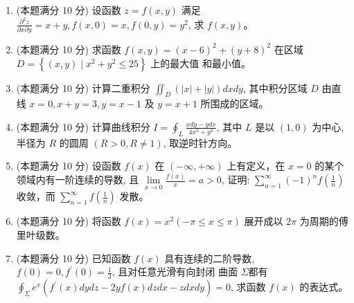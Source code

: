 \begin{enumerate}
\item 
(本题满分 10 分)
设函数 $z=f(x, y)$ 满足 $\frac{\partial^{2} z}{\partial x \partial y}=x+y, f(x, 0)=x, f(0, y)=y^{2}$, 求 $f(x, y)$。




\item 
(本题满分 10 分)
求函数 $f(x, y)=(x-6)^{2}+(y+8)^{2}$ 在区域 $D=\left\{(x, y) \mid x^{2}+y^{2} \leqslant 25\right\}$ 上的最大值 和最小值。



\newpage

\item 
(本题满分 10 分)
计算二重积分 $\iint_{D}(|x|+|y|) d x d y$, 其中积分区域 $D$ 由直线 $x=0, x+y=3, y=x-1$ 及 $y=x+1$ 所围成的区域。





\item 
(本题满分 10 分)
计算曲线积分 $I=\oint_{L} \frac{x d y-y d x}{4 x^{2}+y^{2}}$, 其中 $L$ 是以 $(1,0)$ 为中心, 半径为 $R$ 的圆周 $(R>0, R \neq 1)$, 取逆时针方向。




\item 
(本题满分 10 分)
设函数 $f(x)$ 在 $(-\infty,+\infty)$ 上有定义，在 $x=0$ 的某个领域内有一阶连续的导数, 且 $\lim\limits _{x \rightarrow 0} \frac{f(x)}{x}=a>0$, 证明:
$\sum\limits_{n=1}^{\infty}(-1)^{n} f\left(\frac{1}{n}\right)$ 收敛，而 $\sum\limits_{n=1}^{\infty} f\left(\frac{1}{n}\right)$ 发散。





\item 
(本题满分 10 分)
将函数 $f(x)=x^{2}(-\pi \leqslant x \leqslant \pi)$ 展开成以 $2 \pi$ 为周期的傅里叶级数。




\item 
(本题满分 10 分)
已知函数 $f(x)$ 具有连续的二阶导数, $f(0)=0, f^{\prime}(0)=\frac{1}{3}$, 且对任意光滑有向封闭 曲面 $\Sigma$都有 $\oint_{\Sigma} e^{x}\left(f^{\prime}(x) d y d z-2 y f(x) d z d x-z d x d y\right)=0$, 求函数 $f(x)$ 的表达式。



\end{enumerate}
